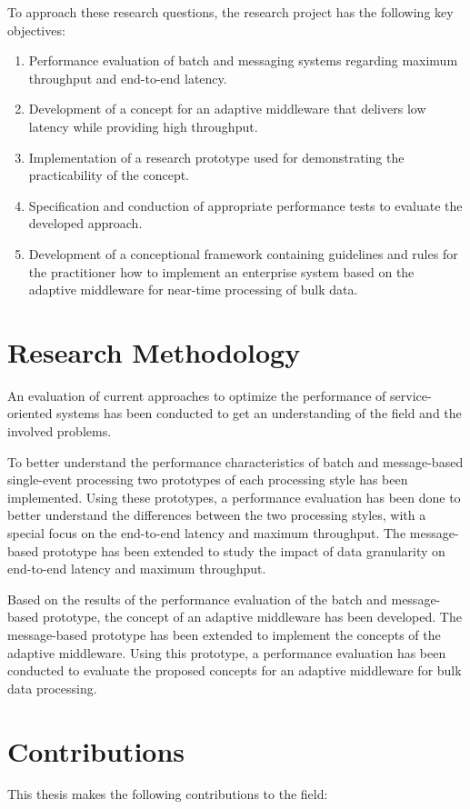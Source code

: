 To approach these research questions, the research project has the following key objectives:
\begin{enumerate}[label=\Alph*.]
	\item Performance evaluation of batch and messaging systems regarding maximum throughput and end-to-end latency.
	\item Development of a concept for an adaptive middleware that delivers low latency while providing high throughput.
	\item Implementation of a research prototype used for demonstrating the practicability of the concept.
	\item Specification and conduction of appropriate performance tests to evaluate the developed approach.
	\item Development of a conceptional framework containing guidelines and rules for the practitioner how to implement an enterprise system based on the adaptive middleware for near-time processing of bulk data.
\end{enumerate}

\section{Research Methodology}
An evaluation of current approaches to optimize the performance of service-oriented systems has been conducted to get an understanding of the field and the involved problems.

To better understand the performance characteristics of batch and message-based single-event processing two prototypes of each processing style has been implemented. Using these prototypes, a performance evaluation has been done to better understand the differences between the two processing styles, with a special focus on the end-to-end latency and maximum throughput. The message-based prototype has been extended to study the impact of data granularity on end-to-end latency and maximum throughput.

Based on the results of the performance evaluation of the batch and message-based prototype, the concept of an adaptive middleware has been developed. The message-based prototype has been extended to implement the concepts of the adaptive middleware. Using this prototype, a performance evaluation has been conducted to evaluate the proposed concepts for an adaptive middleware for bulk data processing.

\section{Contributions}\label{sec:contributions}
This thesis makes the following contributions to the field:

